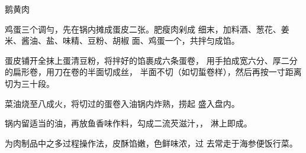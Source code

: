\begin{recipe}{鹅黄肉}

\ingredients


\cooking

\step 鸡蛋三个调勻，先在锅内摊成蛋皮二张。肥瘦肉剁成 细末，加料酒、葱花、姜米、酱油、盐、味精、豆粉、胡椒 面、鸡蛋一个，共拌匀成馅。

\step 	蛋皮铺开全抹上蛋清豆粉，将拌好的馅裹成六条蛋卷， 用手拍成宽六分、厚二分的扁形卷，用刀在卷的半面切成丝， 半面不切（如切蜇卷样），然后再按一寸距离切为三十段。

\step 	菜油烧至八成火，将切过的蛋卷入油锅内炸熟，捞起 盛入盘内。

\step 	锅内留适当的油，再放鱼香味作料，勾成二流芡滋汁，， 淋上即成。

\notes

为肉制品中之多过程操作法，皮酥馅嫩，色鲜味浓，过 去常走于海参便饭行菜。

\end{recipe}

